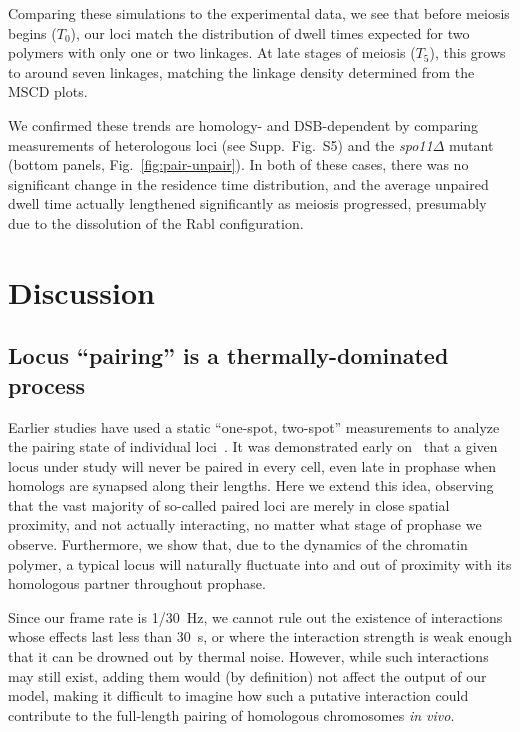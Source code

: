 \documentclass[9pt,twocolumn,twoside,lineno]{pnas-new}
\begin{document}
Comparing these simulations to the experimental data, we see that before meiosis begins ($T_0$), our loci match the distribution of dwell times expected for two polymers with only one or two linkages. At late stages of meiosis ($T_5$), this grows to around seven linkages, matching the linkage density determined from the MSCD plots.

We confirmed these trends are homology- and DSB-dependent by comparing measurements of heterologous loci (see Supp.\ Fig.\ S5) and the \textit{spo11$\Delta$} mutant (bottom panels, Fig.~\ref{fig:pair-unpair}). In both of these cases, there was no significant change in the residence time distribution, and the average unpaired dwell time actually lengthened significantly as meiosis progressed, presumably due to the dissolution of the Rabl configuration.

\section*{Discussion}

\subsection*{Locus ``pairing'' is a thermally-dominated process}



Earlier studies have used a static ``one-spot, two-spot'' measurements to analyze the pairing state of individual loci~\cite{brar2009, conrad2008}.
It was demonstrated early on~\cite{weiner1994, lee2012, loidl1994} that a given locus under study will never be paired in every cell, even late in prophase when homologs are synapsed along their lengths.
Here we extend this idea, observing that the vast majority of so-called paired loci are merely in close spatial proximity, and not actually interacting, no matter what stage of prophase we observe.
Furthermore, we show that, due to the dynamics of the chromatin polymer, a typical locus will naturally fluctuate into and out of proximity with its homologous partner throughout prophase.

Since our frame rate is \SI{1/30}{\hertz}, we cannot rule out the existence of interactions whose effects last less than \SI{30}{\second}, or where the interaction strength is weak enough that it can be drowned out by thermal noise. However, while such interactions may still exist, adding them would (by definition) not affect the output of our model, making it difficult to imagine how such a putative interaction could contribute to the full-length pairing of homologous chromosomes \textit{in vivo}.
\end{document}

